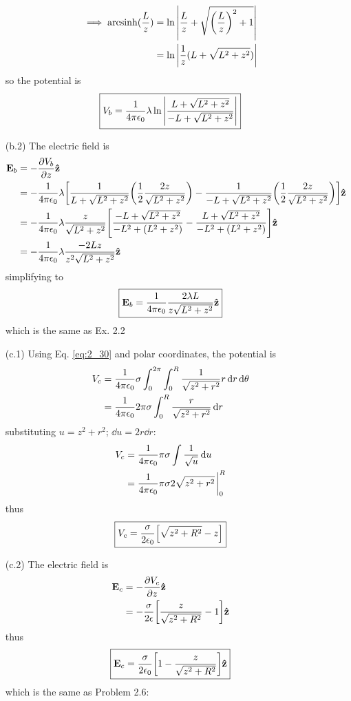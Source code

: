\documentclass[../main.tex]{subfiles}
\begin{document}
\begin{enumerate}
    \begin{align*}
        \implies \arcsinh(\frac{L}{z}) &= \ln \abs{\frac{L}{z} + \sqrt{\qt(\frac{L}{z})^2 + 1}} \\
        &= \ln \abs{\frac{1}{z}(L + \sqrt{L^2 + z^2})}
    \end{align*}
    so the potential is
    \begin{align*}
        \boxed{V_b = \frac{1}{4\pi\epsilon_0} \lambda \ln \abs{\frac{L + \sqrt{L^2 + z^2}}{-L + \sqrt{L^2 + z^2}}}}
    \end{align*}
    \item[(b.2)] The electric field is
    \begin{align*}
        \vb E_b &= -\pdv{V_b}{z} \vu z \\
        &= -\ke \lambda \qt[ \frac{1}{L + \sqrt{L^2 + z^2}} \qt(\frac{1}{2} \frac{2z}{\sqrt{L^2 + z^2}})
            - \frac{1}{-L + \sqrt{L^2 + z^2}} \qt(\frac{1}{2} \frac{2z}{\sqrt{L^2 + z^2}})]\vu z \\
        &= -\ke \lambda \frac{z}{\sqrt{L^2 + z^2}} \qt[\frac{-L + \sqrt{L^2 + z^2}}{-L^2 + (L^2 + z^2)} - \frac{L + \sqrt{L^2 + z^2}}{-L^2 + (L^2 + z^2)}] \vu z \\
        &= -\ke \lambda \frac{-2Lz}{z^2 \sqrt{L^2 + z^2}} \vu z
    \end{align*}
    simplifying to
    \begin{align*}
        \boxed{\vb E_b = \frac{1}{4\pi\epsilon_0} \frac{2\lambda L}{z \sqrt{L^2 + z^2}} \vu z}
    \end{align*}
    which is the same as Ex. 2.2

    \item[(c.1)] Using Eq. \eqref{eq:2_30} and polar coordinates, the potential is
    \begin{align*}
        V_c &= \frac{1}{4\pi\epsilon_0} \sigma \int_0^{2\pi} \int_0^R \frac{1}{\sqrt{z^2 + r^2}} r \dd{r} \dd{\theta} \\
        &= \frac{1}{4\pi\epsilon_0} 2\pi \sigma \int_0^R \frac{r}{\sqrt{z^2 + r^2}} \dd{r}
    \end{align*}
    substituting $u = z^2 + r^2$; $\dd{u} = 2r \dd{r}$:
    \begin{align*}
        V_c &= \ke \pi \sigma \int \frac{1}{\sqrt{u}} \dd{u} \\
        &= \ke \pi \sigma 2 \sqrt{z^2 + r^2} \eval_0^{R}
    \end{align*}
    thus
    \begin{align*}
        \boxed{V_c = \frac{\sigma}{2\epsilon_0} \qt[\sqrt{z^2 + R^2} - z]}
    \end{align*}
    \item[(c.2)] The electric field is
    \begin{align*}
        \vb E_c &= -\pdv{V_c}{z} \vu z \\
        &= -\frac{\sigma}{2\epsilon} \qt[\frac{z}{\sqrt{z^2 + R^2}} - 1] \vu z
    \end{align*}
    thus
    \begin{align*}
        \boxed{\vb E_c = \frac{\sigma}{2\epsilon_0} \qt[1 - \frac{z}{\sqrt{z^2 + R^2}}] \vu z}
    \end{align*}
    which is the same as Problem 2.6:

\end{enumerate}
\end{document}
